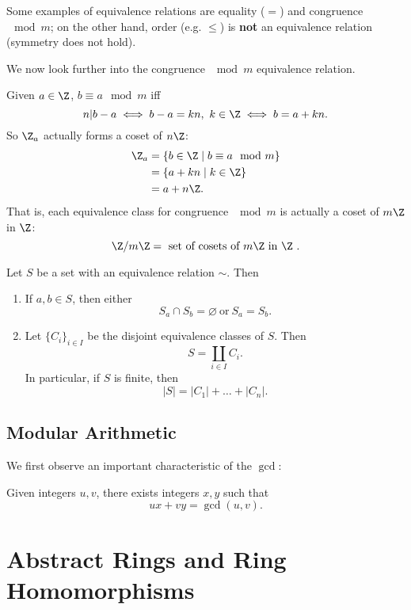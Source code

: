 \documentclass[math1530-lecture-notes]{subfiles}
\begin{document}
Some examples of equivalence relations are equality ($=$) and congruence $\mod{m}$; on the other
hand, order (e.g. $\le $) is \textbf{not} an equivalence relation (symmetry does not hold).

We now look further into the congruence $\mod{m}$ equivalence relation.

\begin{example}
  Given $a \in \Z$, $b \equiv a\mod{m}$ iff \[
    n | b-a \iff b - a = kn,\ k\in \Z \iff b = a + kn
  .\] So $\Z_a$ actually forms a coset of $n\Z$:
  \begin{align*}
    \Z_a &= \{b\in \Z\mid b\equiv a\mod{m}\}  \\
    &= \{a+kn\mid k\in \Z\}  \\
    &= a+n\Z
  .\end{align*}
  That is, each equivalence class for congruence $\mod{m}$ is actually a coset of $m\Z$ in $\Z$: \[
    \Z / m\Z = ~\text{set of cosets of $m\Z$ in $\Z$}~
  .\] 
\end{example}

\begin{theorem}[]{}
  Let $S$ be a set with an equivalence relation $\sim $. Then
  \begin{enumerate}
    \item If $a,b\in S$, then either \[
        S_a \cap S_b = \varnothing ~\text{or}~ S_a = S_b
      .\] 
    \item Let $\{ C_i \}_{i\in I}$ be the disjoint equivalence classes of $S$. Then \[
        S = \coprod_{i\in I}C_i
      .\] In particular, if $S$ is finite, then \[
        \left| S \right| = \left| C_1 \right|+ \ldots+\left| C_n \right|  
      .\] 
  \end{enumerate}
\end{theorem}

\subsection{Modular Arithmetic}

We first observe an important characteristic of the $\gcd$:
\begin{proposition}[]{}
  Given integers $u,v$, there exists integers $x,y$ such that \[
    ux+vy = \gcd{(u, v)}
  .\] 
\end{proposition}





\section{Abstract Rings and Ring Homomorphisms}
\end{document}
